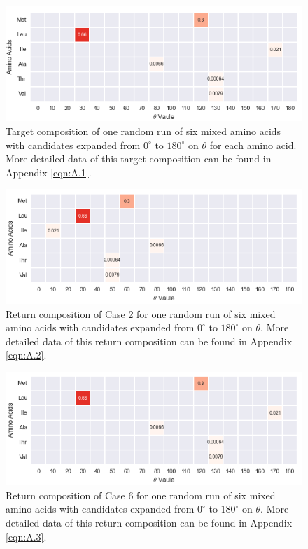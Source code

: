 \begin{figure}[!ht] 
\centering
\includegraphics[scale=0.9]{Figures/mixture_target_composition_for_one_run_theta_0_180.png}
\caption{Target composition of one random run of six mixed amino acids with candidates expanded from $0^{\circ}$ to $180^{\circ}$ on $\theta$ for each amino acid. More detailed data of this target composition can be found in Appendix \ref{eqn:A.1}. } 
\label{fig:5.4}
\end{figure}

\begin{figure}[!ht] 
\centering
\includegraphics[scale=0.9]{Figures/mixture_return_composition_of_E1_for_one_run_theta_0_180.png}
\caption{Return composition of Case 2 for one random run of six mixed amino acids with candidates expanded from $0^{\circ}$ to $180^{\circ}$ on $\theta$. More detailed data of this return composition can be found in Appendix \ref{eqn:A.2}.} 
\label{fig:5.5}
\end{figure}

\begin{figure}[!ht] 
\centering
\includegraphics[scale=0.9]{Figures/mixture_return_composition_of_E6_for_one_run_theta_0_180.png}
\caption{Return composition of Case 6 for one random run of six mixed amino acids with candidates expanded from $0^{\circ}$ to $180^{\circ}$ on $\theta$. More detailed data of this return composition can be found in Appendix \ref{eqn:A.3}.} 
\label{fig:5.6}
\end{figure}

